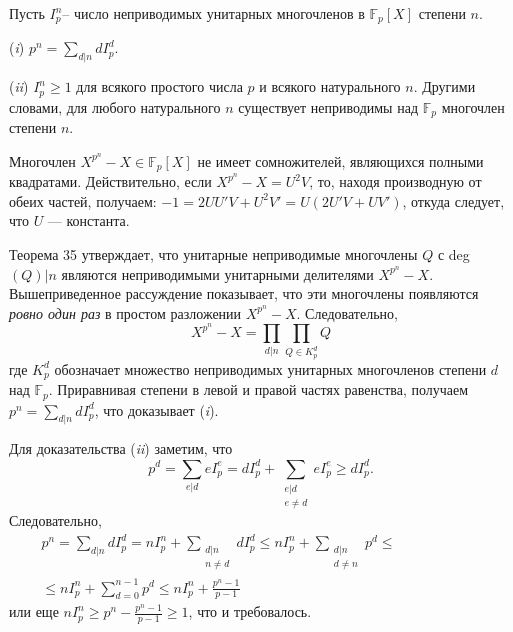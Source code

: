 \begin{sled}
\hspace*{15pt}Пусть $I^n_p$-- число неприводимых унитарных многочленов в $\mathbb{F}_p[X]$
степени $n$.

\pagebreak

\hspace*{15pt}(\textit{i}) $p^n = \sum\limits_{d|n}dI^d_p$.

\hspace*{15pt}(\textit{ii}) $I^n_p \geqslant 1$ для всякого простого числа $p$ и всякого натурального $n$.
Другими словами, для любого натурального $n$ существует неприводимы над $\mathbb{F}_p$ многочлен степени $n$.\newline
\end{sled}

\begin{myproof}
Многочлен $X^{p^n} - X \in \mathbb{F}_p[X]$ не имеет сомножителей, являющихся 
полными квадратами. Действительно, если $X^{p^n} - X = U^2V$, то, 
находя производную от обеих частей, получаем: $-1 = 2UU'V + 
U^2V' = U(2U'V + UV')$, откуда следует, что $U$ — константа.
 
\noindent Теорема 35 утверждает, что унитарные неприводимые многочлены \linebreak
$Q$ с deg$(Q) | n$ являются неприводимыми унитарными делителями 
$X^{p^n} - X$. Вышеприведенное рассуждение показывает, что эти  
многочлены появляются \textit{ровно один раз} в простом разложении $X^{p^n} - X$. 
Следовательно,
\begin{equation*}
X^{p^n} - X =  \prod_{d|n} \prod_{Q\in K^d_p}Q
\end{equation*}
где $K^d_p$ обозначает множество неприводимых унитарных  
многочленов степени $d$ над $\mathbb{F}_p$. Приравнивая степени в левой и правой частях 
равенства, получаем $p^n = \sum_{d|n} dI^d_p$, что доказывает (\textit{i}). 

\noindent Для доказательства (\textit{ii}) заметим, что
\begin{equation*}
p^d = \sum_{e|d}eI^e_p = dI^d_p + \sum_{\substack{e|d{}\\e\neq d}}eI^e_p \geqslant dI^d_p.
\end{equation*}
Следовательно,
\begin{eqnarray*}
p^n = \sum_{d|n}dI^d_p = nI^n_p + \sum_{\substack{d|n\\n\neq d}}dI^d_p \leqslant nI^n_p + \sum_{\substack{d|n{}\\d\neq n}}p^d \leqslant \qquad\qquad\qquad\\
\leqslant nI^n_p + \sum^{n-1}_{d = 0}p^d \leqslant nI^n_p + \frac{p^n - 1}{p - 1}\:\:
\end{eqnarray*}
или еще $nI^n_p \geqslant p^n - \frac{p^n - 1}{p - 1} \geqslant 1$, что и требовалось.
\end{myproof}
\pagebreak

